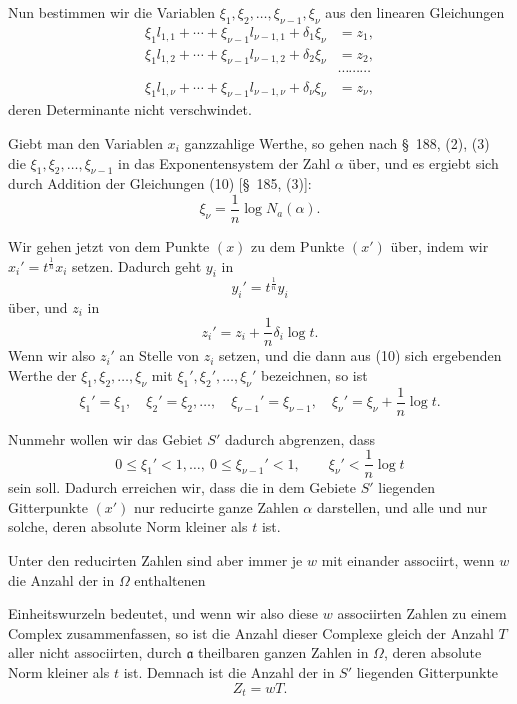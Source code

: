 \documentclass[11pt]{article}
\newcommand{\Na}{N_a}
\begin{document}
Nun bestimmen wir die Variablen $\xi_1,\xi_2,\ldots,\xi_{\nu-1},\xi_\nu$ aus den linearen Gleichungen
\begin{equation}
\begin{aligned}
\xi_1l_{1,1}+\cdots+\xi_{\nu-1}l_{\nu-1,1}+\delta_1\xi_\nu&=z_1,\\
\xi_1l_{1,2}+\cdots+\xi_{\nu-1}l_{\nu-1,2}+\delta_2\xi_\nu&=z_2,\\
&\cdots\cdots\cdots\\
\xi_1l_{1,\nu}+\cdots+\xi_{\nu-1}l_{\nu-1,\nu}+\delta_\nu\xi_\nu&=z_\nu,
\end{aligned}
\tag{10}
\end{equation}
deren Determinante nicht verschwindet.

Giebt man den Variablen $x_i$ ganzzahlige Werthe, so gehen nach \S~188, (2), (3) die $\xi_1,\xi_2,\ldots,\xi_{\nu-1}$ in das Exponentensystem der Zahl $\alpha$ über, und es ergiebt sich durch Addition der Gleichungen (10) [\S~185, (3)]:
\begin{equation}
\xi_\nu=\frac1n\log \Na(\alpha).
\tag{11}
\end{equation}

Wir gehen jetzt von dem Punkte $(x)$ zu dem Punkte $(x')$ über, indem wir $x_i'=t^{\frac1n}x_i$ setzen. Dadurch geht $y_i$ in
\[
y_i'=t^{\frac1n}y_i
\]
über, und $z_i$ in
\[
z_i'=z_i+\frac1n\delta_i\log t.
\]
Wenn wir also $z_i'$ an Stelle von $z_i$ setzen, und die dann aus (10) sich ergebenden Werthe der $\xi_1,\xi_2,\ldots,\xi_\nu$ mit $\xi_1',\xi_2',\ldots,\xi_\nu'$ bezeichnen, so ist
\begin{equation}
\xi_1'=\xi_1,
\quad \xi_2'=\xi_2,
\ldots,
\quad \xi_{\nu-1}'=\xi_{\nu-1},
\quad \xi_\nu'=\xi_\nu+\frac1n\log t.
\tag{12}
\end{equation}

Nunmehr wollen wir das Gebiet $S'$ dadurch abgrenzen, dass
\begin{equation}
0\leq\xi_1'<1,\ldots,\ 0\leq\xi_{\nu-1}'<1,
\qquad
\xi_\nu'<\frac1n\log t
\tag{13}
\end{equation}
sein soll. Dadurch erreichen wir, dass die in dem Gebiete $S'$ liegenden Gitterpunkte $(x')$ nur reducirte ganze Zahlen $\alpha$ darstellen, und alle und nur solche, deren absolute Norm kleiner als $t$ ist.

Unter den reducirten Zahlen sind aber immer je $w$ mit einander associirt, wenn $w$ die Anzahl der in $\Omega$ enthaltenen

Einheitswurzeln bedeutet, und wenn wir also diese $w$ associirten Zahlen zu einem Complex zusammenfassen, so ist die Anzahl dieser Complexe gleich der Anzahl $T$ aller nicht associirten, durch $\mathfrak a$ theilbaren ganzen Zahlen in $\Omega$, deren absolute Norm kleiner als $t$ ist. Demnach ist die Anzahl der in $S'$ liegenden Gitterpunkte
\begin{equation}
Z_t=wT.
\tag{14}
\end{equation}
\end{document}
